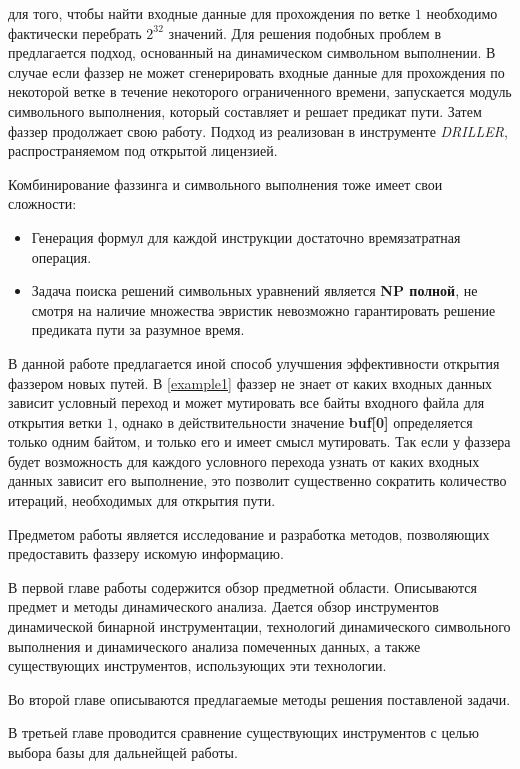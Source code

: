 для того, чтобы найти входные данные для прохождения по ветке $1$ необходимо фактически перебрать $2^{32}$ значений. Для решения подобных проблем в \cite{DRILLER} предлагается подход, основанный на динамическом символьном выполнении. В случае если фаззер не может сгенерировать входные данные для прохождения по некоторой ветке в течение некоторого ограниченного времени, запускается модуль символьного выполнения, который составляет и решает предикат пути. Затем фаззер продолжает свою работу.
Подход из \cite{DRILLER} реализован в инструменте \emph{DRILLER}, распространяемом под открытой лицензией.

Комбинирование фаззинга и символьного выполнения тоже имеет свои сложности:
\begin{itemize}
    \item Генерация формул для каждой инструкции достаточно времязатратная операция.
    \item Задача поиска решений символьных уравнений является \textbf{NP полной}, не смотря на наличие множества эвристик невозможно гарантировать решение предиката пути за разумное время.
\end{itemize}

В данной работе предлагается иной способ улучшения эффективности открытия фаззером новых путей. В \ref{example1} фаззер не знает от каких входных данных зависит условный переход и может мутировать все байты входного файла для открытия ветки $1$, однако в действительности значение \textbf{buf[0]} определяется только одним байтом, и только его и имеет смысл мутировать.
Так если у фаззера будет возможность для каждого условного перехода узнать от каких входных данных зависит его выполнение, это позволит существенно сократить количество итераций, необходимых для открытия пути.

Предметом работы является исследование и разработка методов, позволяющих предоставить фаззеру искомую информацию.

В первой главе работы содержится обзор предметной области. Описываются предмет и методы динамического анализа. Дается обзор инструментов динамической бинарной инструментации, технологий динамического символьного выполнения и динамического анализа помеченных данных, а также существующих инструментов, использующих эти технологии.

Во второй главе описываются предлагаемые методы решения поставленой задачи.

В третьей главе проводится сравнение существующих инструментов с целью выбора базы для дальнейщей работы.

